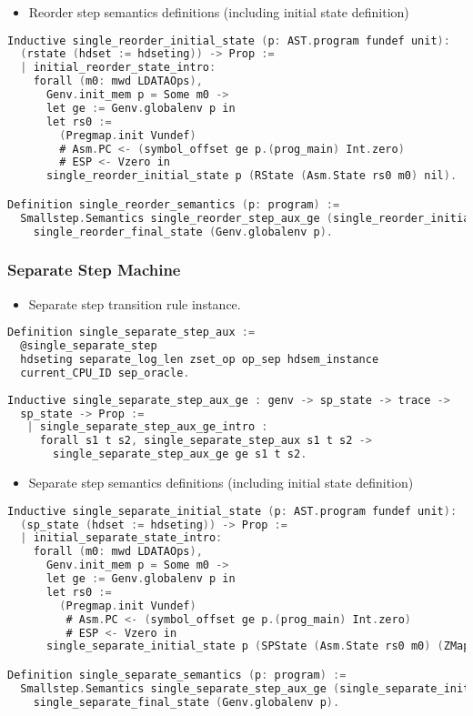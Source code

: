 \begin{itemize}[leftmargin=*]
\item Reorder step semantics definitions (including initial state definition)
\end{itemize}
\begin{lstlisting}[language=C]
Inductive single_reorder_initial_state (p: AST.program fundef unit): 
  (rstate (hdset := hdseting)) -> Prop :=
  | initial_reorder_state_intro: 
    forall (m0: mwd LDATAOps),
      Genv.init_mem p = Some m0 ->
      let ge := Genv.globalenv p in
      let rs0 :=
        (Pregmap.init Vundef)
        # Asm.PC <- (symbol_offset ge p.(prog_main) Int.zero)
        # ESP <- Vzero in
      single_reorder_initial_state p (RState (Asm.State rs0 m0) nil).

Definition single_reorder_semantics (p: program) :=
  Smallstep.Semantics single_reorder_step_aux_ge (single_reorder_initial_state p) 
    single_reorder_final_state (Genv.globalenv p).
\end{lstlisting}

\subsubsection{Separate Step Machine}
\begin{itemize}[leftmargin=*]
\item Separate step transition rule instance.
\end{itemize}
\begin{lstlisting}[language=C]
Definition single_separate_step_aux :=
  @single_separate_step
  hdseting separate_log_len zset_op op_sep hdsem_instance
  current_CPU_ID sep_oracle.
    
Inductive single_separate_step_aux_ge : genv -> sp_state -> trace -> 
  sp_state -> Prop :=
   | single_separate_step_aux_ge_intro : 
     forall s1 t s2, single_separate_step_aux s1 t s2 -> 
       single_separate_step_aux_ge ge s1 t s2.
\end{lstlisting}

\begin{itemize}[leftmargin=*]
\item Separate step semantics definitions (including initial state definition)
\end{itemize}
\begin{lstlisting}[language=C]
Inductive single_separate_initial_state (p: AST.program fundef unit): 
  (sp_state (hdset := hdseting)) -> Prop :=
  | initial_separate_state_intro: 
    forall (m0: mwd LDATAOps),
      Genv.init_mem p = Some m0 ->
      let ge := Genv.globalenv p in
      let rs0 :=
        (Pregmap.init Vundef)
         # Asm.PC <- (symbol_offset ge p.(prog_main) Int.zero)
         # ESP <- Vzero in
      single_separate_initial_state p (SPState (Asm.State rs0 m0) (ZMap.init nil)).

Definition single_separate_semantics (p: program) :=
  Smallstep.Semantics single_separate_step_aux_ge (single_separate_initial_state p) 
    single_separate_final_state (Genv.globalenv p).
\end{lstlisting}